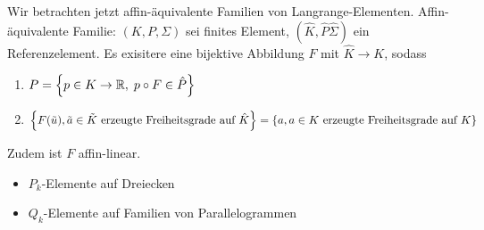 Wir betrachten jetzt affin-äquivalente Familien von Langrange-Elementen.
Affin-äquivalente Familie: $(K, P, \Sigma)$ sei finites Element,  $(\hat K, \hat P \hat \Sigma)$  ein Referenzelement. Es exisitere eine bijektive Abbildung $F$ mit $\hat K \to K$, sodass 
\begin{enumerate}
\item $P = \left\{ p \in K \to \mathbb{R}, \; p \circ F \in \hat P \right\}$
\item $\left\{ F(\tilde u), \tilde a \in \tilde K \text{ erzeugte Freiheitsgrade auf } \hat K \right\} = \left\{ a, a\in K \text{ erzeugte Freiheitsgrade auf } K \right\}$
\end{enumerate}
Zudem ist $F$ affin-linear.
\begin{beispiel}
  \begin{itemize}
  \item $P_k$-Elemente auf Dreiecken
  \item $Q_k$-Elemente auf Familien von Parallelogrammen
  \end{itemize}
\end{beispiel}

